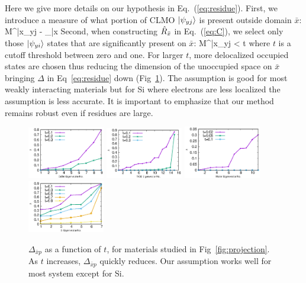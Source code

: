 \documentclass[aps,prl,twocolumn,reprint,amsmath,amssymb]{revtex4-1}
\begin{document}
Here we give more details on our hypothesis in Eq.~(\ref{eq:residue}). First, we introduce a measure of what portion of CLMO $\vert \psi_{yj} \rangle$ is present outside domain $\bar{x}$:
\bea
M^{\bar{x}}_{yj} \equiv {} - _{\bar{x}}
\eea
%
Second, when constructing $\hat{R}_{\bar{x}}$ in Eq.~(\ref{eq:C}), we select only those $\vert \psi_{yi} \rangle$ states that are significantly present on $\bar{x}$: 
\bea
M^{\bar{x}}_{yj} < t
\eea
%
where $t$ is a cutoff threshold between zero and one. 
For larger $t$, more delocalized occupied states are chosen thus reducing the dimension of the unoccupied space on $\bar{x}$ bringing $\Delta$ in Eq~\ref{eq:residue} down (Fig~\ref{sfig:t_delta}). 
The assumption is good for most weakly interacting materials but for Si where electrons are less localized the assumption is less accurate. It is important to emphasize that our method remains robust even if residues are large.

\begin{figure}
\centering
\includegraphics[width=0.3\textwidth]{t_cdse_residue}
\includegraphics[width=0.3\textwidth]{t_tio2_residue}
\includegraphics[width=0.3\textwidth]{t_water_residue}
\includegraphics[width=0.3\textwidth]{t_si_residue}
\caption{$\Delta_{\bar{x}p}$ as a function of $t$, for materials studied in Fig~\ref{fig:projection}. As $t$ increases, $\Delta_{\bar{x}p}$ quickly reduces. Our assumption works well for most system except for Si.}
\label{sfig:t_delta}
\end{figure}
\end{document}
